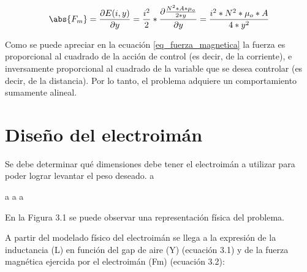\begin{equation}\label{eq_fuerza_magnetica}
	\abs{F_{m}}=\frac{\partial{E(i,y)}}{\partial{y}}=\frac{i^{2}}{2}*\frac{\partial{\frac{{N^{2}*A*\mu_{o}}}{2*y}}}{\partial{y}}=\frac{i^{2}*N^{2}*\mu_{o}*A}{4*y^{2}}
\end{equation}

Como se puede apreciar en la ecuación \ref{eq_fuerza_magnetica} la fuerza es proporcional al cuadrado de la acción de control (es decir, de la corriente), e inversamente proporcional al cuadrado de la variable que se desea controlar (es decir, de la distancia). Por lo tanto, el problema adquiere un comportamiento sumamente alineal.

\section{Diseño del electroimán}

Se debe determinar qué dimensiones debe tener el electroimán a utilizar para poder lograr levantar el peso deseado.
a

a
a
a


En la Figura 3.1 se puede observar una representación física del problema.


A partir del modelado físico del electroimán se llega a la expresión de la inductancia (L) en función del gap de aire (Y) (ecuación 3.1) y de la fuerza magnética ejercida por el electroimán (Fm) (ecuación 3.2):


